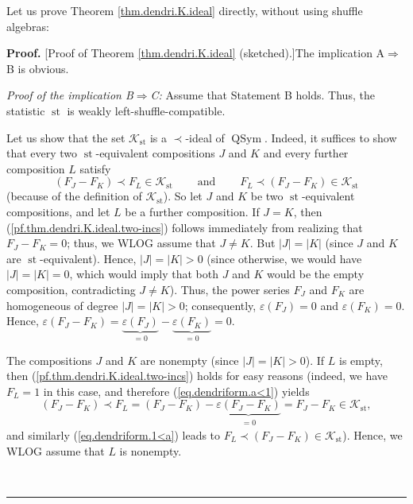\documentclass[numbers=enddot,12pt,final,onecolumn,notitlepage]{scrartcl}%
\theoremstyle{definition}
\newenvironment{proof}[1][Proof]{\noindent\textbf{#1.} }{\ \rule{0.5em}{0.5em}}
\newenvironment{verlong}{}{}
\begin{document}
\begin{verlong}
Let us prove Theorem \ref{thm.dendri.K.ideal} directly, without using shuffle algebras:

\begin{proof}
[Proof of Theorem \ref{thm.dendri.K.ideal} (sketched).]The implication
A$\Longrightarrow$B is obvious.

\textit{Proof of the implication B}$\Longrightarrow$\textit{C:} Assume that
Statement B holds. Thus, the statistic $\operatorname{st}$ is weakly left-shuffle-compatible.

Let us show that the set $\mathcal{K}_{\operatorname{st}}$ is a $\left.
\prec\right.  $-ideal of $\operatorname*{QSym}$. Indeed, it suffices to show
that every two $\operatorname{st}$-equivalent compositions $J$ and $K$ and
every further composition $L$ satisfy%
\begin{equation}
\left(  F_{J}-F_{K}\right)  \left.  \prec\right.  F_{L}\in\mathcal{K}%
_{\operatorname{st}}\ \ \ \ \ \ \ \ \ \ \text{and}\ \ \ \ \ \ \ \ \ \ F_{L}%
\left.  \prec\right.  \left(  F_{J}-F_{K}\right)  \in\mathcal{K}%
_{\operatorname{st}} \label{pf.thm.dendri.K.ideal.two-incs}%
\end{equation}
(because of the definition of $\mathcal{K}_{\operatorname{st}}$). So let $J$
and $K$ be two $\operatorname{st}$-equivalent compositions, and let $L$ be a
further composition. If $J=K$, then (\ref{pf.thm.dendri.K.ideal.two-incs})
follows immediately from realizing that $F_{J}-F_{K}=0$; thus, we WLOG assume
that $J\neq K$. But $\left\vert J\right\vert =\left\vert K\right\vert $ (since
$J$ and $K$ are $\operatorname{st}$-equivalent). Hence, $\left\vert
J\right\vert =\left\vert K\right\vert >0$ (since otherwise, we would have
$\left\vert J\right\vert =\left\vert K\right\vert =0$, which would imply that
both $J$ and $K$ would be the empty composition, contradicting $J\neq K$).
Thus, the power series $F_{J}$ and $F_{K}$ are homogeneous of degree
$\left\vert J\right\vert =\left\vert K\right\vert >0$; consequently,
$\varepsilon\left(  F_{J}\right)  =0$ and $\varepsilon\left(  F_{K}\right)
=0$. Hence, $\varepsilon\left(  F_{J}-F_{K}\right)  =\underbrace{\varepsilon
\left(  F_{J}\right)  }_{=0}-\underbrace{\varepsilon\left(  F_{K}\right)
}_{=0}=0$.

The compositions $J$ and $K$ are nonempty (since $\left\vert J\right\vert
=\left\vert K\right\vert >0$). If $L$ is empty, then
(\ref{pf.thm.dendri.K.ideal.two-incs}) holds for easy reasons (indeed, we have
$F_{L}=1$ in this case, and therefore (\ref{eq.dendriform.a<1}) yields
\[
\left(  F_{J}-F_{K}\right)  \left.  \prec\right.  F_{L}=\left(  F_{J}%
-F_{K}\right)  -\underbrace{\varepsilon\left(  F_{J}-F_{K}\right)
}_{\substack{=0}}=F_{J}-F_{K}\in\mathcal{K}_{\operatorname{st}},
\]
and similarly (\ref{eq.dendriform.1<a}) leads to $F_{L}\left.  \prec\right.
\left(  F_{J}-F_{K}\right)  \in\mathcal{K}_{\operatorname{st}}$). Hence, we
WLOG assume that $L$ is nonempty.


\end{proof}
\end{verlong}
\end{document}
